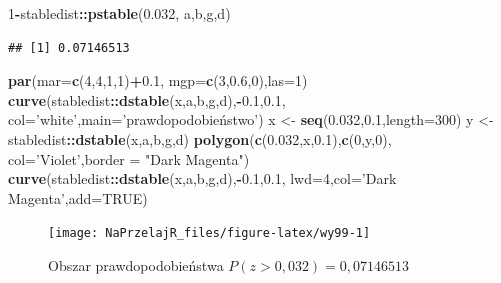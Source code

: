 \documentclass[polish,]{book}
\newenvironment{Shaded}{\begin{snugshade}}{\end{snugshade}}
\newcommand{\DataTypeTok}[1]{\textcolor[rgb]{0.13,0.29,0.53}{#1}}
\newcommand{\DecValTok}[1]{\textcolor[rgb]{0.00,0.00,0.81}{#1}}
\newcommand{\FloatTok}[1]{\textcolor[rgb]{0.00,0.00,0.81}{#1}}
\newcommand{\KeywordTok}[1]{\textcolor[rgb]{0.13,0.29,0.53}{\textbf{#1}}}
\newcommand{\NormalTok}[1]{#1}
\newcommand{\OperatorTok}[1]{\textcolor[rgb]{0.81,0.36,0.00}{\textbf{#1}}}
\newcommand{\OtherTok}[1]{\textcolor[rgb]{0.56,0.35,0.01}{#1}}
\newcommand{\StringTok}[1]{\textcolor[rgb]{0.31,0.60,0.02}{#1}}
\begin{document}
\begin{Shaded}
\begin{Highlighting}[]
\DecValTok{1}\OperatorTok{-}\NormalTok{stabledist}\OperatorTok{::}\KeywordTok{pstable}\NormalTok{(}\FloatTok{0.032}\NormalTok{, a,b,g,d)}
\end{Highlighting}
\end{Shaded}

\begin{verbatim}
## [1] 0.07146513
\end{verbatim}

\begin{Shaded}
\begin{Highlighting}[]
\KeywordTok{par}\NormalTok{(}\DataTypeTok{mar=}\KeywordTok{c}\NormalTok{(}\DecValTok{4}\NormalTok{,}\DecValTok{4}\NormalTok{,}\DecValTok{1}\NormalTok{,}\DecValTok{1}\NormalTok{)}\OperatorTok{+}\FloatTok{0.1}\NormalTok{, }\DataTypeTok{mgp=}\KeywordTok{c}\NormalTok{(}\DecValTok{3}\NormalTok{,}\FloatTok{0.6}\NormalTok{,}\DecValTok{0}\NormalTok{),}\DataTypeTok{las=}\DecValTok{1}\NormalTok{)}
\KeywordTok{curve}\NormalTok{(stabledist}\OperatorTok{::}\KeywordTok{dstable}\NormalTok{(x,a,b,g,d),}\OperatorTok{-}\FloatTok{0.1}\NormalTok{,}\FloatTok{0.1}\NormalTok{,}
      \DataTypeTok{col=}\StringTok{'white'}\NormalTok{,}\DataTypeTok{main=}\StringTok{'prawdopodobieństwo'}\NormalTok{)}
\NormalTok{x <-}\StringTok{ }\KeywordTok{seq}\NormalTok{(}\FloatTok{0.032}\NormalTok{,}\FloatTok{0.1}\NormalTok{,}\DataTypeTok{length=}\DecValTok{300}\NormalTok{)}
\NormalTok{y <-}\StringTok{ }\NormalTok{stabledist}\OperatorTok{::}\KeywordTok{dstable}\NormalTok{(x,a,b,g,d)}
\KeywordTok{polygon}\NormalTok{(}\KeywordTok{c}\NormalTok{(}\FloatTok{0.032}\NormalTok{,x,}\FloatTok{0.1}\NormalTok{),}\KeywordTok{c}\NormalTok{(}\DecValTok{0}\NormalTok{,y,}\DecValTok{0}\NormalTok{),}
        \DataTypeTok{col=}\StringTok{'Violet'}\NormalTok{,}\DataTypeTok{border =} \StringTok{"Dark Magenta"}\NormalTok{)}
\KeywordTok{curve}\NormalTok{(stabledist}\OperatorTok{::}\KeywordTok{dstable}\NormalTok{(x,a,b,g,d),}\OperatorTok{-}\FloatTok{0.1}\NormalTok{,}\FloatTok{0.1}\NormalTok{,}
      \DataTypeTok{lwd=}\DecValTok{4}\NormalTok{,}\DataTypeTok{col=}\StringTok{'Dark Magenta'}\NormalTok{,}\DataTypeTok{add=}\OtherTok{TRUE}\NormalTok{)}
\end{Highlighting}
\end{Shaded}

\begin{figure}[h]

{\centering \texttt{[image: NaPrzelajR\_files/figure-latex/wy99-1]} 

}

\caption{Obszar prawdopodobieństwa $P(z>0,032)=0,07146513$}\label{fig:wy99}
\end{figure}
\end{document}
